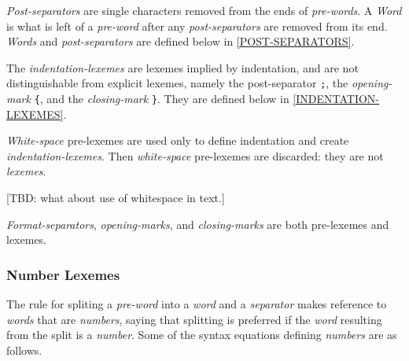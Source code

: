\documentclass[12pt]{article}
\begin{document}
{\em Post-separators} are single characters removed from the
ends of {\em pre-words}.  A {\em Word} is what is left of
a {\em pre-word} after any {\em post-separators}
are removed from its end.
{\em Words} and {\em post-separators} are defined
below in \ref{POST-SEPARATORS}.


The {\em indentation-lexemes} are lexemes implied by indentation, and
are not distinguishable from explicit lexemes, namely the post-separator
\verb|;|, the {\em opening-mark} \verb|{|, and the {\em closing-mark}
\verb|}|.  They are defined below in
\ref{INDENTATION-LEXEMES}.

{\em White-space} pre-lexemes are used only to define indentation and
create {\em indentation-lexemes}.
Then {\em white-space} pre-lexemes are
discarded: they are not {\em lexemes}.

[TBD: what about use of whitespace in text.]

{\em Format-separators}, {\em opening-marks}, and {\em closing-marks}
are both pre-lexemes and lexemes.

\subsubsection{Number Lexemes}
\label{NUMBER-LEXEMES}

The rule for spliting a {\em pre-word} into a {\em word}
and a {\em separator} makes reference to {\em words} that are
{\em numbers}, saying that splitting is preferred if the {\em word}
resulting from the split is a {\em number}.  Some of the syntax equations
defining {\em numbers} are as follows.
\end{document}
